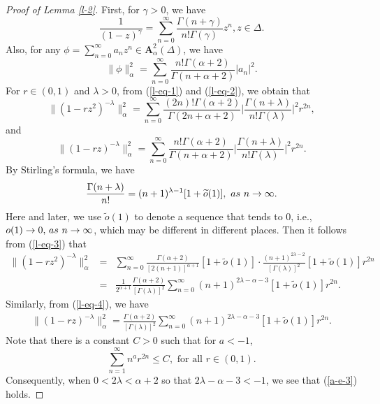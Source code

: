 \documentclass[10pt,a4paper]{amsart}
\begin{document}
\begin{proof}[Proof of Lemma \ref{l-2}]
First, for $\gamma>0$, we have 
\begin{equation}\label{l-eq-1}
  \frac{1}{(1-z)^{\gamma}}=\sum_{n=0}^{\infty}\frac{\Gamma(n+\gamma)}{n!\Gamma(\gamma)}z^n, z\in \Delta.\end{equation}
Also, for any $\phi=\sum_{n=0}^{\infty}a_nz^n\in \mathbf{A}_{\alpha}^2(\Delta)$, we have
\begin{equation}\label{l-eq-2}\|\phi\|_{\alpha}^2=\sum_{n=0}^{\infty}\frac{n!\Gamma(\alpha+2)}{\Gamma(n+\alpha+2)}|a_n|^{2}.
\end{equation}
For $r\in (0,1)$ and $\lambda>0$, from (\ref{l-eq-1}) and (\ref{l-eq-2}), we obtain that
  \begin{equation}\label{l-eq-3}
 \|{(1-rz^2)^{-\lambda}}\|_{\alpha}^2=\sum_{n=0}^{\infty}\frac{(2n)!\Gamma(\alpha+2)}{\Gamma(2n+\alpha+2)}\Big|\frac{\Gamma(n+\lambda)}{n!\Gamma(\lambda)}\Big|^2 r^{2n}, 
 \end{equation}
and 
 \begin{equation}\label{l-eq-4}
 \|{(1-rz)^{-\lambda}}\|_{\alpha}^2=\sum_{n=0}^{\infty}\frac{n!\Gamma(\alpha+2)}{\Gamma(n+\alpha+2)}\Big|\frac{\Gamma(n+\lambda)}{n!\Gamma(\lambda)}\Big|^2 r^{2n}.
 \end{equation}
By Stirling's formula, we have
 \begin{equation}
 \frac{\Gamma(n+\lambda)}{n!}=(n+1)^{\lambda-1}[1+\widetilde{o}(1)],\,\, {\textup{as}} \,\, n\rightarrow \infty.\nonumber 
 \end{equation}
 Here and later, we use $\widetilde{o}(1)$ to denote a sequence that tends to $0$, i.e., $o(1)\rightarrow 0, \, {\textup{as}}\,\, n \rightarrow \infty$, which may be different in different places. Then it follows from (\ref{l-eq-3}) that 
 \begin{eqnarray}\label{l-eq-5}
 \|{(1-rz^2)^{-\lambda}}\|_{\alpha}^2&=&\sum_{n=0}^{\infty}\frac{\Gamma(\alpha+2)}{[2(n+1)]^{\alpha+1}}[1+\widetilde{o}(1)]\cdot\frac{(n+1)^{2\lambda-2}}{[\Gamma(\lambda)]^2}[1+\widetilde{o}(1)]r^{2n}\nonumber \\
 &=&\frac{1}{2^{\alpha+1}}\frac{\Gamma(\alpha+2)}{[\Gamma(\lambda)]^2}\sum_{n=0}^{\infty}{(n+1)^{2\lambda-\alpha-3}}[1+\widetilde{o}(1)]r^{2n}.
 \end{eqnarray}
Similarly, from (\ref{l-eq-4}), we have 
 \begin{eqnarray}\label{l-eq-6}
 \|{(1-rz)^{-\lambda}}\|_{\alpha}^2=\frac{\Gamma(\alpha+2)}{[\Gamma(\lambda)]^2}\sum_{n=0}^{\infty}{(n+1)^{2\lambda-\alpha-3}}[1+\widetilde{o}(1)]r^{2n}.
 \end{eqnarray}
Note that there is a constant $C>0$ such that for $a<-1$,
$$\sum_{n=1}^{\infty}n^a r^{2n}\leq C,\,\,{\text{for all}}\,\, r\in (0,1).$$
Consequently, when $0<2\lambda<\alpha+2$ so that $2\lambda-\alpha-3<-1$, we see that (\ref{a-e-3}) holds. 


\end{proof}
\end{document}
